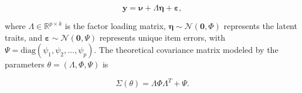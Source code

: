 \documentclass{article}
\theoremstyle{definition}
\begin{document}
\begin{equation}
\mathbf{y} = \boldsymbol{\nu} + \Lambda \boldsymbol{\eta} + \boldsymbol{\varepsilon},
\end{equation}

\noindent
where $\Lambda \in \mathbb{R}^{p \times k}$ is the factor loading matrix, $\boldsymbol{\eta} \sim \mathcal{N}(\mathbf{0}, \Phi)$ represents the latent traits, and $\boldsymbol{\varepsilon} \sim \mathcal{N}(\mathbf{0}, \Psi)$ represents unique item errors, with $\Psi = \text{diag}(\psi_1, \psi_2, \dots, \psi_p)$. The theoretical covariance matrix modeled by the parameters $\theta = (\Lambda, \Phi, \Psi)$ is

\begin{equation}
\Sigma(\theta) = \Lambda \Phi \Lambda^T + \Psi.
\end{equation}
\end{document}

